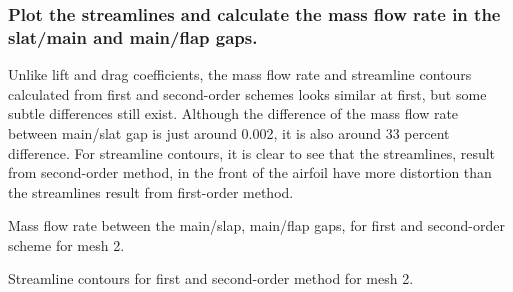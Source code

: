 \documentclass[letterpaper,onecolumn,12pt]{article}
\makeatletter
\newenvironment{tablehere}
  {\def\@captype{table}}{}
\newenvironment{figurehere}
  {\def\@captype{figure}}{}
\makeatother
\begin{document}
\subsubsection{Plot the streamlines and calculate the mass flow rate in the slat/main and main/flap gaps.}
Unlike lift and drag coefficients, the mass flow rate and streamline contours calculated from first and second-order schemes looks similar at first, but some subtle differences still exist. Although the difference of the mass flow rate between main/slat gap is just around 0.002, it is also around 33 percent difference. For streamline contours, it is clear to see that the streamlines, result from second-order method, in the front of the airfoil have more distortion than the streamlines result from first-order method.

\bigskip

\begin{tablehere}
\centering
{}
\qquad
{}
\caption{Mass flow rate between the main/slap, main/flap gaps, for first and second-order scheme for mesh 2.}
\end{tablehere}

\begin{figurehere}
 \centering 
  \hspace{.05cm} 
  \caption{Streamline contours for first and second-order method for mesh 2.} 
\end{figurehere}
\end{document}
